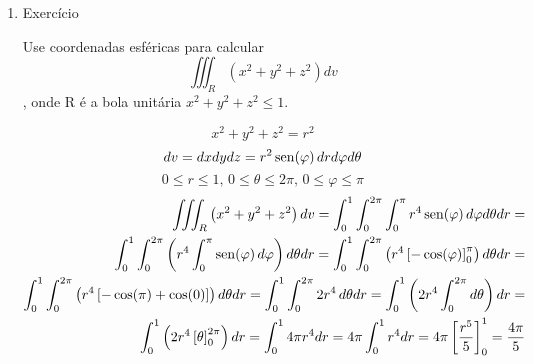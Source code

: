\begin{enumerate}
	\item Exercício
	
	Use coordenadas esféricas para calcular $$\iiint_R\left(x^2+y^2+z^2\right)dv$$, onde R é a bola unitária $x^2+y^2+z^2 \leq 1$.
	
	\begin{equation*}
		x^2+y^2+z^2 = r^2
	\end{equation*}
	\begin{equation*}
		dv = dxdydz = r^2 \operatorname{sen}(\varphi)\, dr d\varphi d\theta
	\end{equation*}
	\begin{equation*}
		0 \leq r \leq 1,\, 0 \leq \theta \leq 2\pi,\, 0 \leq \varphi \leq \pi
	\end{equation*} 
	\begin{align*}
		\iiint_R\left(x^2+y^2+z^2\right)dv = \int_0^1 \int_0^{2\pi} \int_0^{\pi} r^4\operatorname{sen}(\varphi)\, d\varphi d\theta dr =\\ \int_0^1 \int_0^{2\pi} \left(r^4 \int_0^{\pi} \operatorname{sen}(\varphi)\, d\varphi\right)d\theta dr = \int_0^1 \int_0^{2\pi} \left(r^4\left[-\cos(\varphi)\right]_0^{\pi}  \right)d\theta dr =\\ \int_0^1 \int_0^{2\pi} \left(r^4\left[-\cos(\pi) + \cos(0 )\right]  \right)d\theta dr = \int_0^1 \int_0^{2\pi} 2r^4\, d\theta dr = \int_0^1\left(2r^4\int_0^{2\pi} d\theta\right) dr =\\ \int_0^1\left(2r^4\left[\theta\right]_0^{2\pi}\right) dr = \int_0^1 4\pi r^4 dr = 4\pi\int_0^1 r^4 dr = 4\pi\left[\dfrac{r^5}{5}\right]_0^1 = \dfrac{4\pi}{5}
	\end{align*}
\end{enumerate}